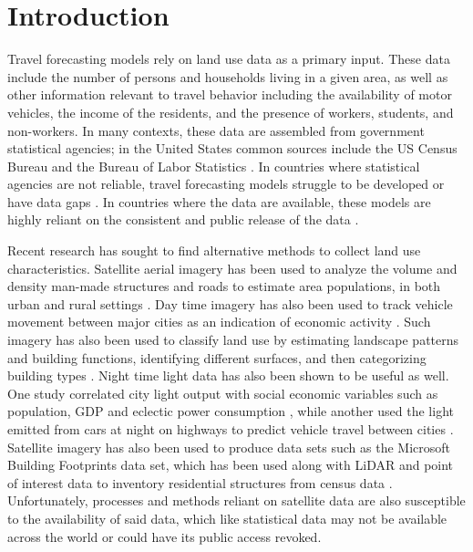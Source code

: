 \documentclass[conference,]{IEEEtran}
\begin{document}
\section{Introduction}\label{introduction}

Travel forecasting models rely on land use data as a primary input.
These data include the number of persons and households living in a
given area, as well as other information relevant to travel behavior
including the availability of motor vehicles, the income of the
residents, and the presence of workers, students, and non-workers. In
many contexts, these data are assembled from government statistical
agencies; in the United States common sources include the US Census
Bureau and the Bureau of Labor Statistics \autocite{nchrp}. In countries
where statistical agencies are not reliable, travel forecasting models
struggle to be developed or have data gaps
\autocite{abueisheh_trip_2024}. In countries where the data are
available, these models are highly reliant on the consistent and public
release of the data \autocite{rohanna_census_2006}.

Recent research has sought to find alternative methods to collect land
use characteristics. Satellite aerial imagery has been used to analyze
the volume and density man-made structures and roads to estimate area
populations, in both urban and rural settings
\autocite{allaw_population_2020,fibaek_multi-sensor_2021}. Day time
imagery has also been used to track vehicle movement between major
cities as an indication of economic activity
\autocite{lehnert_proxying_2023}. Such imagery has also been used to
classify land use by estimating landscape patterns and building
functions, identifying different surfaces, and then categorizing
building types \autocite{zhang_landscape_2020}. Night time light data
has also been shown to be useful as well. One study correlated city
light output with social economic variables such as population, GDP and
eclectic power consumption \autocite{kamarajugedda_assessing_2017},
while another used the light emitted from cars at night on highways to
predict vehicle travel between cities \autocite{chang_novel_2020}.
Satellite imagery has also been used to produce data sets such as the
Microsoft Building Footprints data set, which has been used along with
LiDAR and point of interest data to inventory residential structures
from census data
\autocite{microsoft_globalmlbuildingfootprints_2026,ye_enhancing_2024}.
Unfortunately, processes and methods reliant on satellite data are also
susceptible to the availability of said data, which like statistical
data may not be available across the world or could have its public
access revoked.
\end{document}
